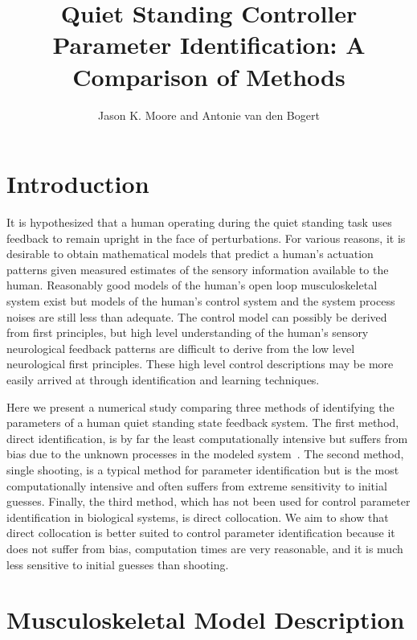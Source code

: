 \documentclass{article}
\title{Quiet Standing Controller Parameter Identification: A Comparison of
Methods}
\author{Jason K. Moore and Antonie van den Bogert}
\begin{document}
\maketitle

\section{Introduction}

It is hypothesized that a human operating during the quiet standing task uses
feedback to remain upright in the face of perturbations. For various reasons,
it is desirable to obtain mathematical models that predict a human's actuation
patterns given measured estimates of the sensory information available to the
human.  Reasonably good models of the human's open loop musculoskeletal system
exist but models of the human's control system and the system process noises
are still less than adequate. The control model can possibly be derived from
first principles, but high level understanding of the human's sensory
neurological feedback patterns are difficult to derive from the low level
neurological first principles. These high level control descriptions may be
more easily arrived at through identification and learning techniques.

Here we present a numerical study comparing three methods of identifying the
parameters of a human quiet standing state feedback system. The first method,
direct identification, is by far the least computationally intensive but
suffers from bias due to the unknown processes in the modeled
system~\cite{Kooij2010}. The second method, single shooting, is a typical
method for parameter identification but is the most computationally intensive
and often suffers from extreme sensitivity to initial guesses. Finally, the
third method, which has not been used for control parameter identification in
biological systems, is direct collocation. We aim to show that direct
collocation is better suited to control parameter identification because it
does not suffer from bias, computation times are very reasonable, and it is
much less sensitive to initial guesses than shooting.

\section{Musculoskeletal Model Description}
\end{document}
